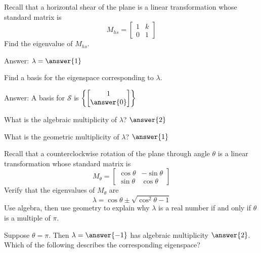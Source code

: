 \documentclass{ximera}
\begin{document}
\begin{problem}\label{prob:eigvectorstransfr2_2}
Recall that a horizontal shear of the plane is a linear transformation whose standard matrix is $$M_{hs}=\begin{bmatrix}1&k\\0&1\end{bmatrix}$$
Find the eigenvalue of $M_{hs}$.  

Answer: $\lambda=\answer{1}$

Find a basis for the eigenspace corresponding to $\lambda$.

Answer:  A basis for $\mathcal{S}$ is $\left\{\begin{bmatrix}1\\\answer{0}\end{bmatrix}\right\}$

What is the algebraic multiplicity of $\lambda$? $\answer{2}$

What is the geometric multiplicity of $\lambda$? $\answer{1}$

\end{problem}

\begin{problem}\label{prob:rotmatrixrealeig2}
Recall that a counterclockwise rotation of the plane through angle $\theta$ is a linear transformation whose standard matrix is $$M_{\theta}=\begin{bmatrix}\cos\theta&-\sin\theta\\\sin\theta&\cos\theta\end{bmatrix}$$
Verify that the eigenvalues of $M_{\theta}$ are
$$\lambda=\cos\theta\pm\sqrt{\cos^2\theta-1}$$
Use algebra, then use geometry to explain why $\lambda$ is a real number if and only if $\theta$ is a multiple of $\pi$.  

Suppose $\theta=\pi$.  Then $\lambda =\answer{-1}$ has algebraic multiplicity $\answer{2}$.  Which of the following describes the corresponding eigenspace?
\begin{multipleChoice}
\end{multipleChoice}

\end{problem}
\end{document}
